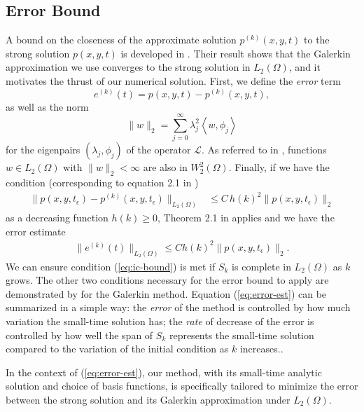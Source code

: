 \documentclass[10pt]{article}
\begin{document}
\subsection{Error Bound} \label{sec:error-bound}
A bound on the closeness of the approximate solution $p^{(k)}(x,y,t)$
to the strong solution $p(x,y,t)$ is developed in
\cite{bramble1977some}.  Their result shows that the Galerkin
approximation we use converges to the strong solution in
$L_2(\Omega)$, and it motivates the thrust of our numerical
solution. First, we define the \textit{error} term
\[
  e^{(k)}(t) = p(x,y,t) - p^{(k)}(x,y,t),
\]
as well as the norm
\[
  \| w \|_2 = \sum_{j=0}^\infty \lambda_j^2 \left<w, \phi_j\right>
\]
for the eigenpairs $(\lambda_j, \phi_j)$ of the operator
$\mathcal{L}$. As referred to in \cite{bramble1977some}, functions
$w \in L_2(\Omega)$ with $\|w\|_2 < \infty$ are also in
$W_2^2(\Omega)$. Finally, if we have the condition (corresponding to
equation 2.1 in \cite{bramble1977some})
\begin{align}
  \| p(x,y,t_\epsilon) - p^{(k)}(x,y,t_\epsilon) \|_{L_2(\Omega)} &\leq C\, h(k)^2 \| p(x,y,t_\epsilon) \|_2 \label{eq:ic-bound}
\end{align}
as a decreasing function $h(k) \geq 0$, Theorem 2.1 in
\cite{bramble1977some} applies and we have the error estimate
\begin{align}
  \| e^{(k)}(t) \|_{L_2(\Omega)} \leq C h(k)^2 \| p(x,y,t_\epsilon) \|_{2}. \label{eq:error-est}
\end{align}
We can ensure condition (\ref{eq:ic-bound}) is met if $S_k$ is
complete in $L_2(\Omega)$ as $k$ grows. The other two conditions
necessary for the error bound to apply are demonstrated by
\cite{bramble1977some} for the Galerkin method. Equation
(\ref{eq:error-est}) can be summarized in a simple way: the
\textit{error} of the method is controlled by how much variation the
small-time solution has; the \textit{rate} of decrease of the error is
controlled by how well the span of $S_k$ represents the small-time
solution compared to the variation of the initial condition as $k$
increases..

In the context of (\ref{eq:error-est}), our method, with its small-time
analytic solution and choice of basis functions, is specifically
tailored to minimize the error between the strong solution and its
Galerkin approximation under $L_2(\Omega)$.

\end{document}
